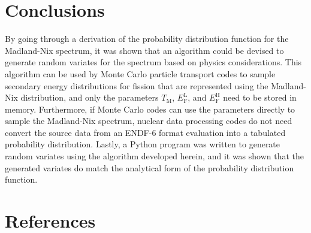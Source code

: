 \documentclass[5p]{elsarticle}
\newcommand{\tmax}{T_{\mathrm{M}}}
\newcommand{\efl}{E_{\mathrm{F}}^{\mathrm{L}}}
\newcommand{\efh}{E_{\mathrm{F}}^{\mathrm{H}}}
\begin{document}
\section{Conclusions}

By going through a derivation of the probability distribution function for the
Madland-Nix spectrum, it was shown that an algorithm could be devised to
generate random variates for the spectrum based on physics considerations. This
algorithm can be used by Monte Carlo particle transport codes to sample
secondary energy distributions for fission that are represented using the
Madland-Nix distribution, and only the parameters $\tmax$, $\efl$, and $\efh$
need to be stored in memory. Furthermore, if Monte Carlo codes can use the
parameters directly to sample the Madland-Nix spectrum, nuclear data processing
codes do not need convert the source data from an ENDF-6 format evaluation into
a tabulated probability distribution. Lastly, a Python program was written to
generate random variates using the algorithm developed herein, and it was shown
that the generated variates do match the analytical form of the probability
distribution function.

\section*{References}



\end{document}
